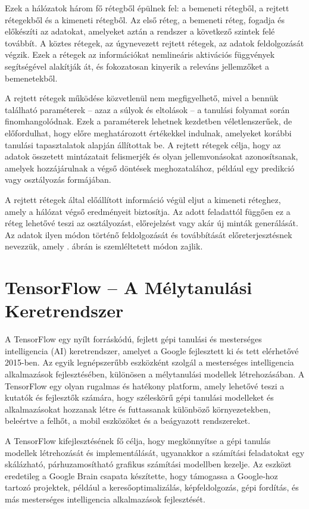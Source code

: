 \documentclass[
]{thesis-ekf}
\theoremstyle{definition}
\theoremstyle{remark}
\begin{document}
	Ezek a hálózatok három fő rétegből épülnek fel: a bemeneti rétegből, a rejtett rétegekből és a kimeneti rétegből. Az első réteg, a bemeneti réteg, fogadja és előkészíti az adatokat, amelyeket aztán a rendszer a következő szintek felé továbbít. A köztes rétegek, az úgynevezett rejtett rétegek, az adatok feldolgozását végzik. Ezek a rétegek az információkat nemlineáris aktivációs függvények segítségével alakítják át, és fokozatosan kinyerik a releváns jellemzőket a bemenetekből. \cite{neuralNetwork}
	
	A rejtett rétegek működése közvetlenül nem megfigyelhető, mivel a bennük található paraméterek – azaz a súlyok és eltolások – a tanulási folyamat során finomhangolódnak. Ezek a paraméterek lehetnek kezdetben véletlenszerűek, de előfordulhat, hogy előre meghatározott értékekkel indulnak, amelyeket korábbi tanulási tapasztalatok alapján állítottak be. A rejtett rétegek célja, hogy az adatok összetett mintázatait felismerjék és olyan jellemvonásokat azonosítsanak, amelyek hozzájárulnak a végső döntések meghozatalához, például egy predikció vagy osztályozás formájában. \cite{neuralNetwork}
	
	A rejtett rétegek által előállított információ végül eljut a kimeneti réteghez, amely a hálózat végső eredményeit biztosítja. Az adott feladattól függően ez a réteg lehetővé teszi az osztályozást, előrejelzést vagy akár új minták generálását. Az adatok ilyen módon történő feldolgozását és továbbítását előreterjesztésnek nevezzük, amely . ábrán is szemléltetett módon zajlik. \cite{neuralNetwork}
	
	\section{TensorFlow – A Mélytanulási Keretrendszer}
	
	A TensorFlow egy nyílt forráskódú, fejlett gépi tanulási és mesterséges intelligencia (AI) keretrendszer, amelyet a Google fejlesztett ki és tett elérhetővé 2015-ben. Az egyik legnépszerűbb eszközként szolgál a mesterséges intelligencia alkalmazások fejlesztésében, különösen a mélytanulási modellek létrehozásában. A TensorFlow egy olyan rugalmas és hatékony platform, amely lehetővé teszi a kutatók és fejlesztők számára, hogy széleskörű gépi tanulási modelleket és alkalmazásokat hozzanak létre és futtassanak különböző környezetekben, beleértve a felhőt, a mobil eszközöket és a beágyazott rendszereket.
	
	A TensorFlow kifejlesztésének fő célja, hogy megkönnyítse a gépi tanulás modellek létrehozását és implementálását, ugyanakkor a számítási feladatokat egy skálázható, párhuzamosítható grafikus számítási modellben kezelje. Az eszközt eredetileg a Google Brain csapata készítette, hogy támogassa a Google-hoz tartozó projektek, például a keresőoptimalizálás, képfeldolgozás, gépi fordítás, és más mesterséges intelligencia alkalmazások fejlesztését.
	
\end{document}
